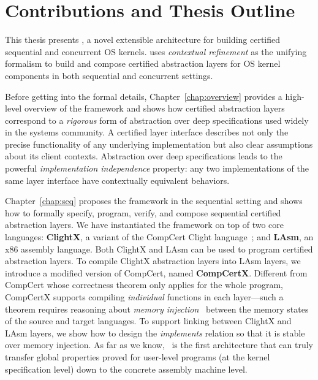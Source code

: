 \section{Contributions and Thesis Outline}
\label{sec:intro:contribution}

This thesis presents \CTOS{}, a novel extensible architecture
for building certified sequential and concurrent OS kernels.
\CTOS{} uses {\em contextual
    refinement} as the unifying formalism to build and
    compose certified abstraction layers for OS kernel components
in both sequential and concurrent settings. 

Before getting into the formal details,
Chapter~\ref{chap:overview}
provides a high-level overview of
the \CTOS{} framework
and  shows how 
certified
  abstraction layers  correspond to a {\em rigorous} 
  form of abstraction over deep specifications used widely
  in the systems community. A certified layer interface
  describes not only the precise functionality of any underlying
  implementation but also clear assumptions about its client contexts.
  Abstraction over deep specifications leads to the powerful
  {\em implementation independence} property: 
  any two implementations
  of the same layer interface have contextually equivalent behaviors.
  
Chapter~\ref{chap:seq} proposes 
the \CTOS{} framework in the sequential setting
and shows how to formally specify,
program, verify, and compose sequential certified abstraction layers. 
We have instantiated the framework on top of two core
  languages: {\bf
    ClightX}, a variant of the CompCert Clight
  language~\cite{blazy-leroy-clight}; and {\bf LAsm}, an x86 assembly
  language.  Both ClightX and LAsm can be used to program certified
  abstraction layers.
  To compile
 ClightX abstraction layers into 
  LAsm layers, we introduce a modified version of CompCert,
  named {\bf CompCertX}.
  Different from CompCert whose correctness theorem only applies
  for the whole program,
CompCertX supports compiling \emph{individual} functions in each
  layer---such a theorem requires reasoning about {\em memory
    injection}~\cite{leroy08} between the memory states of the source
  and target languages.  To support linking between ClightX and LAsm
  layers, we show how to design the {\em implements} relation so that it
  is stable over memory injection.
    As far as we
  know, \CTOS\ is the first architecture that can truly transfer
  global properties proved for user-level programs (at the kernel
  specification level) down to the concrete assembly machine level.
  
